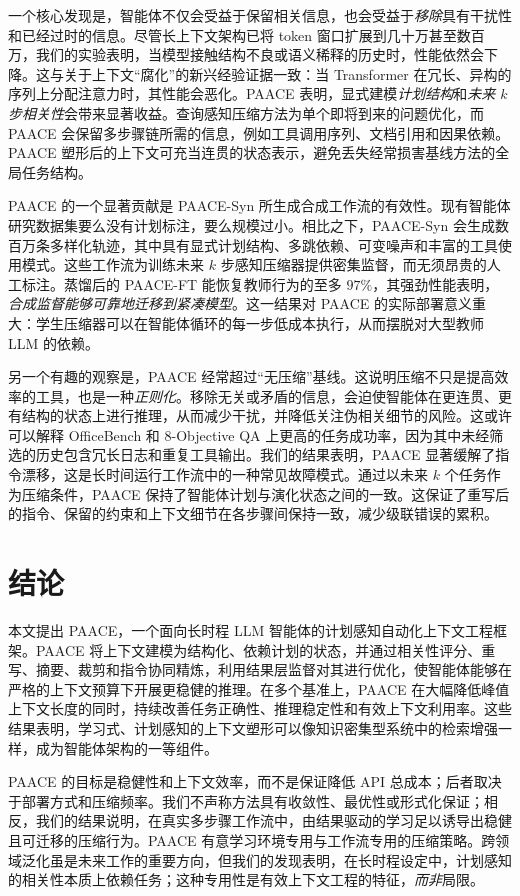 \documentclass[10pt,twocolumn]{article}
\begin{document}
一个核心发现是，智能体不仅会受益于保留相关信息，也会受益于\emph{移除}具有干扰性和已经过时的信息。尽管长上下文架构已将 token 窗口扩展到几十万甚至数百万，我们的实验表明，当模型接触结构不良或语义稀释的历史时，性能依然会下降。这与关于上下文“腐化”的新兴经验证据一致：当 Transformer 在冗长、异构的序列上分配注意力时，其性能会恶化。PAACE 表明，显式建模\emph{计划结构}和\emph{未来 $k$ 步相关性}会带来显著收益。查询感知压缩方法为单个即将到来的问题优化，而 PAACE 会保留多步骤链所需的信息，例如工具调用序列、文档引用和因果依赖。PAACE 塑形后的上下文可充当连贯的状态表示，避免丢失经常损害基线方法的全局任务结构。

PAACE 的一个显著贡献是 PAACE-Syn 所生成合成工作流的有效性。现有智能体研究数据集要么没有计划标注，要么规模过小。相比之下，PAACE-Syn 会生成数百万条多样化轨迹，其中具有显式计划结构、多跳依赖、可变噪声和丰富的工具使用模式。这些工作流为训练未来 $k$ 步感知压缩器提供密集监督，而无须昂贵的人工标注。蒸馏后的 PAACE-FT 能恢复教师行为的至多 $97\%$，其强劲性能表明，\emph{合成监督能够可靠地迁移到紧凑模型}。这一结果对 PAACE 的实际部署意义重大：学生压缩器可以在智能体循环的每一步低成本执行，从而摆脱对大型教师 LLM 的依赖。

另一个有趣的观察是，PAACE 经常超过“无压缩”基线。这说明压缩不只是提高效率的工具，也是一种\emph{正则化}。移除无关或矛盾的信息，会迫使智能体在更连贯、更有结构的状态上进行推理，从而减少干扰，并降低关注伪相关细节的风险。这或许可以解释 OfficeBench 和 8-Objective QA 上更高的任务成功率，因为其中未经筛选的历史包含冗长日志和重复工具输出。我们的结果表明，PAACE 显著缓解了指令漂移，这是长时间运行工作流中的一种常见故障模式。通过以未来 $k$ 个任务作为压缩条件，PAACE 保持了智能体计划与演化状态之间的一致。这保证了重写后的指令、保留的约束和上下文细节在各步骤间保持一致，减少级联错误的累积。

\section{结论}

本文提出 PAACE，一个面向长时程 LLM 智能体的计划感知自动化上下文工程框架。PAACE 将上下文建模为结构化、依赖计划的状态，并通过相关性评分、重写、摘要、裁剪和指令协同精炼，利用结果层监督对其进行优化，使智能体能够在严格的上下文预算下开展更稳健的推理。在多个基准上，PAACE 在大幅降低峰值上下文长度的同时，持续改善任务正确性、推理稳定性和有效上下文利用率。这些结果表明，学习式、计划感知的上下文塑形可以像知识密集型系统中的检索增强一样，成为智能体架构的一等组件。

PAACE 的目标是稳健性和上下文效率，而不是保证降低 API 总成本；后者取决于部署方式和压缩频率。我们不声称方法具有收敛性、最优性或形式化保证；相反，我们的结果说明，在真实多步骤工作流中，由结果驱动的学习足以诱导出稳健且可迁移的压缩行为。PAACE 有意学习环境专用与工作流专用的压缩策略。跨领域泛化虽是未来工作的重要方向，但我们的发现表明，在长时程设定中，计划感知的相关性本质上依赖任务；这种专用性是有效上下文工程的特征，\emph{而非}局限。
\end{document}
